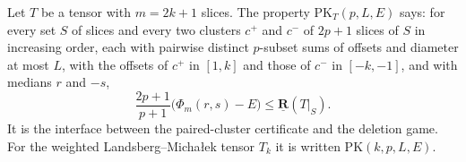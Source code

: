 \begin{definition}
  \label{def:frontiers-paired-koszul-bound}
  \leanok
  Let $T$ be a tensor with $m = 2k + 1$ slices. The property
  $\mathrm{PK}_T(p, L, E)$ says: for every set $S$ of slices and every two clusters $c^+$
  and $c^-$ of $2p + 1$ slices of $S$ in increasing order, each with pairwise distinct
  $p$-subset sums of offsets and diameter at most $L$, with the offsets of $c^+$ in $[1, k]$
  and those of $c^-$ in $[-k, -1]$, and with medians $r$ and $-s$,
  \[
    \frac{2p + 1}{p + 1} \bigl(\Phi_m(r, s) - E\bigr) \le \underline{\mathbf{R}}(T|_S).
  \]
  It is the interface between the paired-cluster certificate and the deletion game. For the
  weighted Landsberg--Micha{\l}ek tensor $T_k$ it is written $\mathrm{PK}(k, p, L, E)$.
\end{definition}


